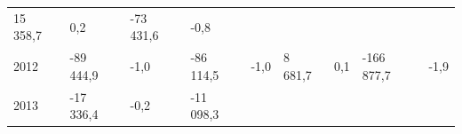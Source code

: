 \begin{longtable}[]{@{}lllllllll@{}}
\begin{minipage}[t]{0.12\columnwidth}
15 358,7\strut
\end{minipage} & \begin{minipage}[t]{0.06\columnwidth}\raggedright
0,2\strut
\end{minipage} & \begin{minipage}[t]{0.09\columnwidth}\raggedright
-73 431,6\strut
\end{minipage} & \begin{minipage}[t]{0.06\columnwidth}\raggedright
-0,8\strut
\end{minipage}\tabularnewline
\begin{minipage}[t]{0.05\columnwidth}\raggedright
2012\strut
\end{minipage} & \begin{minipage}[t]{0.10\columnwidth}\raggedright
-89 444,9\strut
\end{minipage} & \begin{minipage}[t]{0.06\columnwidth}\raggedright
-1,0\strut
\end{minipage} & \begin{minipage}[t]{0.16\columnwidth}\raggedright
-86 114,5\strut
\end{minipage} & \begin{minipage}[t]{0.06\columnwidth}\raggedright
-1,0\strut
\end{minipage} & \begin{minipage}[t]{0.12\columnwidth}\raggedright
8 681,7\strut
\end{minipage} & \begin{minipage}[t]{0.06\columnwidth}\raggedright
0,1\strut
\end{minipage} & \begin{minipage}[t]{0.09\columnwidth}\raggedright
-166 877,7\strut
\end{minipage} & \begin{minipage}[t]{0.06\columnwidth}\raggedright
-1,9\strut
\end{minipage}\tabularnewline
\begin{minipage}[t]{0.05\columnwidth}\raggedright
2013\strut
\end{minipage} & \begin{minipage}[t]{0.10\columnwidth}\raggedright
-17 336,4\strut
\end{minipage} & \begin{minipage}[t]{0.06\columnwidth}\raggedright
-0,2\strut
\end{minipage} & \begin{minipage}[t]{0.16\columnwidth}\raggedright
-11 098,3\strut

\end{minipage}
\end{longtable}

